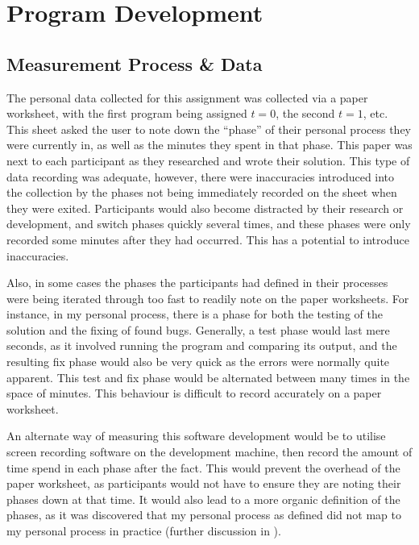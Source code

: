 \documentclass[a4paper,10pt]{article}
\begin{document}
\section{Program Development}
\subsection{Measurement Process \& Data}
The personal data collected for this assignment was collected via a paper worksheet, with the first program being assigned $t=0$, the second $t=1$, etc. This sheet asked the user to note down the ``phase'' of their personal process they were currently in, as well as the minutes they spent in that phase. This paper was next to each participant as they researched and wrote their solution. This type of data recording was adequate, however, there were inaccuracies introduced into the collection by the phases not being immediately recorded on the sheet when they were exited. Participants would also become distracted by their research or development, and switch phases quickly several times, and these phases were only recorded some minutes after they had occurred. This has a potential to introduce inaccuracies.

Also, in some cases the phases the participants had defined in their processes were being iterated through too fast to readily note on the paper worksheets. For instance, in my personal process, there is a phase for both the testing of the solution and the fixing of found bugs. Generally, a test phase would last mere seconds, as it involved running the program and comparing its output, and the resulting fix phase would also be very quick as the errors were normally quite apparent. This test and fix phase would be alternated between many times in the space of minutes. This behaviour is difficult to record accurately on a paper worksheet. 

An alternate way of measuring this software development would be to utilise screen recording software on the development machine, then record the amount of time spend in each phase after the fact. This would prevent the overhead of the paper worksheet, as participants would not have to ensure they are noting their phases down at that time. It would also lead to a more organic definition of the phases, as it was discovered that my personal process as defined did not map to my personal process in practice (further discussion in ).
\end{document}

